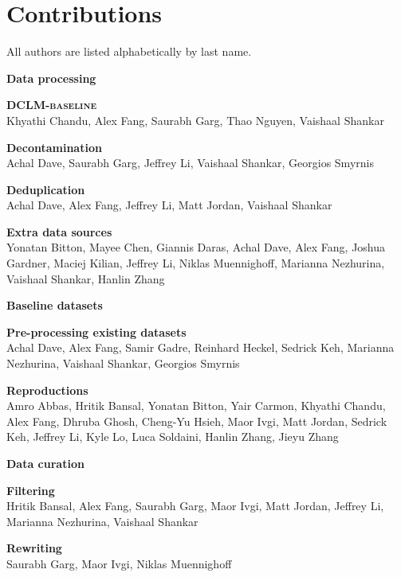 \documentclass{article}
\newcommand{\hqpool}{\textsc{DCLM-baseline}\xspace}
\begin{document}
\clearpage

\appendix

%

\section{Contributions}\label{appx:contributions}

All authors are listed alphabetically by last name.


\begin{center}\large\textbf{Data processing}\end{center}
\textbf{\hqpool}\\[0.5em]
Khyathi Chandu, Alex Fang, Saurabh Garg, Thao Nguyen, Vaishaal Shankar

\textbf{Decontamination}\\[0.5em]
Achal Dave, Saurabh Garg, Jeffrey Li, Vaishaal Shankar, Georgios Smyrnis

\textbf{Deduplication}\\[0.5em]
Achal Dave, Alex Fang, Jeffrey Li, Matt Jordan, Vaishaal Shankar

\textbf{Extra data sources}\\[0.25em]
Yonatan Bitton, Mayee Chen, Giannis Daras, Achal Dave, Alex Fang, Joshua Gardner, Maciej Kilian, Jeffrey Li, Niklas Muennighoff, Marianna Nezhurina, Vaishaal Shankar, Hanlin Zhang

\begin{center}\large\textbf{Baseline datasets}\end{center}
\textbf{Pre-processing existing datasets}\\[0.25em]
Achal Dave, Alex Fang, Samir Gadre, Reinhard Heckel, Sedrick Keh, Marianna Nezhurina, Vaishaal Shankar, Georgios Smyrnis

\textbf{Reproductions}\\[0.25em]
Amro Abbas, Hritik Bansal, Yonatan Bitton, Yair Carmon, Khyathi Chandu, Alex Fang, Dhruba Ghosh, Cheng-Yu Hsieh, Maor Ivgi, Matt Jordan, Sedrick Keh, Jeffrey Li, Kyle Lo, Luca Soldaini, Hanlin Zhang, Jieyu Zhang

\begin{center}\large\textbf{Data curation}\end{center}

\textbf{Filtering}\\[0.25em]
Hritik Bansal, Alex Fang, Saurabh Garg, Maor Ivgi, Matt Jordan, Jeffrey Li, Marianna Nezhurina, Vaishaal Shankar

\textbf{Rewriting}\\[0.25em]
Saurabh Garg, Maor Ivgi, Niklas Muennighoff
\end{document}
